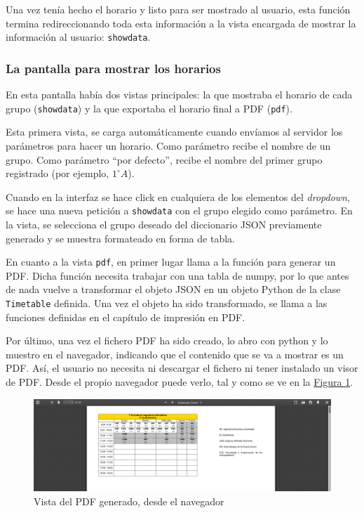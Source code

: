 Una vez tenía hecho el horario y listo para ser mostrado al usuario, esta función termina redireccionando toda esta información a la vista encargada de mostrar la información al usuario: \texttt{showdata}.

\subsubsection{La pantalla para mostrar los horarios}
En esta pantalla había dos vistas principales: la que mostraba el horario de cada grupo (\texttt{showdata}) y la que exportaba el horario final a PDF (\texttt{pdf}).

Esta primera vista, se carga automáticamente cuando envíamos al servidor los parámetros para hacer un horario. Como parámetro recibe el nombre de un grupo. Como parámetro ``por defecto'', recibe el nombre del primer grupo registrado (por ejemplo, $1^{\circ} A$).

Cuando en la interfaz se hace click en cualquiera de los elementos del \textit{dropdown}, se hace una nueva petición a \texttt{showdata} con el grupo elegido como parámetro. En la vista, se selecciona el grupo deseado del diccionario JSON previamente generado y se muestra formateado en forma de tabla.

En cuanto a la vista \texttt{pdf}, en primer lugar llama a la función para generar un PDF. Dicha función necesita trabajar con una tabla de numpy, por lo que antes de nada vuelve a transformar el objeto JSON en un objeto Python de la clase \texttt{Timetable} definida. Una vez el objeto ha sido transformado, se llama a las funciones definidas en el capítulo de impresión en PDF.

Por último, una vez el fichero PDF ha sido creado, lo abro con python y lo muestro en el navegador, indicando que el contenido que se va a mostrar es un PDF. Así, el usuario no necesita ni descargar el fichero ni tener instalado un visor de PDF. Desde el propio navegador puede verlo, tal y como se ve en la \hyperref[pdf]{Figura \ref*{pdf}}.

\begin{figure}
\centering
\includegraphics[width=\textwidth]{img/pdf}
\caption{Vista del PDF generado, desde el navegador}
\label{pdf}
\end{figure}

